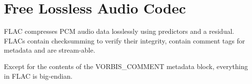 
\chapter{Free Lossless Audio Codec}
FLAC compresses PCM audio data losslessly using predictors and a
residual.
FLACs contain checksumming to verify their integrity, contain comment tags for
metadata and are stream-able.

Except for the contents of the VORBIS\_COMMENT metadata block, everything in FLAC is big-endian.




\clearpage



\clearpage


